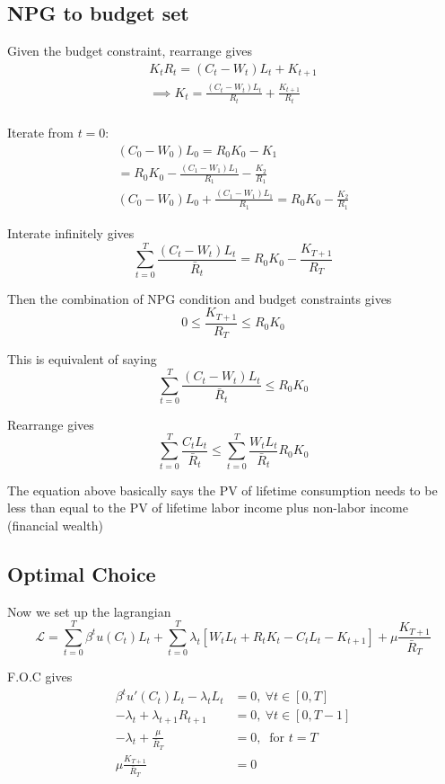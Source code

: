 \documentclass[twocolumn, fleqn]{article}
\begin{document}
		\subsection{NPG to budget set}\label{subsec:npg-to-budget-set}
			Given the budget constraint, rearrange gives
			\begin{gather*}
			    K_t R_t =(C_t - W_t)L_t+K_{t+1}\\
			    \implies K_t =\frac{(C_t - W_t)L_t}{R_t}+\frac{K_{t+1}}{R_t}\\
			\end{gather*}

			Iterate from $t=0$:
			\begin{gather*}
				(C_0-W_0)L_0 = R_0 K_0 - K_1 \\
				= R_0 K_0 - \frac{(C_1 - W_1)L_1}{R_1} - \frac{K_2}{R_1}\\
				(C_0 -W_0)L_0 + \frac{(C_1-W_1)L_1}{R_1} = R_{0} K_0 - \frac{K_2}{R_1}
			\end{gather*}

			Interate infinitely gives
			\[
				\sum_{t=0}^{T}\frac{(C_t-W_t)L_t}{\bar{R}_t} = R_0 K_0 - \frac{K_{T+1}}{R_T}
			\]

			Then the combination of NPG condition and budget constraints gives
			\[
				0 \leq \frac{K_{T+1}}{R_T} \leq R_0 K_0
			\]

			This is equivalent of saying
			\[
				\sum_{t=0}^{T} \frac{(C_t-W_t)L_t}{\bar{R}_t} \leq R_0 K_0
			\]

			Rearrange gives
			\[
				\sum_{t=0}^{T} \frac{C_t L_t}{\bar{R}_t} \leq \sum_{t=0}^{T} \frac{W_t L_t}{\bar{R}_t} R_0 K_0
			\]

			The equation above basically says the PV of lifetime consumption needs to be less than equal to the PV
			of lifetime labor income plus non-labor income (financial wealth)

	\subsection{Optimal Choice}\label{subsec:optimal-choice}
		Now we set up the lagrangian
		\[
			\mathcal{L} = \sum_{t=0}^{T} \beta^t u(C_t)L_t + \sum_{t=0}^{T} \lambda_t [W_t L_t + R_t K_t - C_t L_t - K_{t+1}] + \mu \frac{K_{T+1}}{\bar{R}_T}
		\]

		F.O.C gives
		\begin{align*}
			\beta^t u'(C_t)L_t - \lambda_t L_t &= 0, \ \forall t \in [0,T] \tag{2.1}\\
			- \lambda_t + \lambda_{t+1} R_{t+1} &= 0, \ \forall t \in [0, T-1] \tag{2.2}\\
			- \lambda_t + \frac{\mu}{\bar{R}_T} &= 0, \ \text{ for } t =T \tag{2.3}\\
			\mu \frac{K_{T+1}}{\bar{R}_T} &= 0 \tag{C.S.}
		\end{align*}
\end{document}
